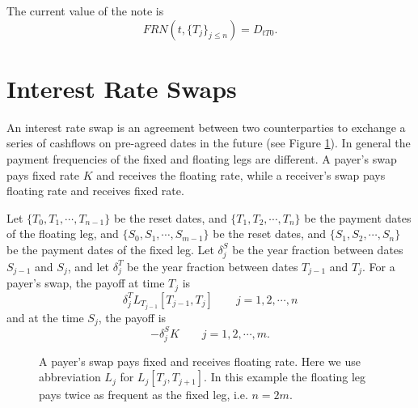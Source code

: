 The current value of the note is
\begin{equation}
  FRN(t,\{T_j\}_{j\le n}) = D_{tT0}.
\end{equation}


\section{Interest Rate Swaps}
An interest rate swap is an agreement between two counterparties
to exchange a series of cashflows on pre-agreed dates in the future (see Figure
\ref{F:swap}). In general the payment frequencies of the fixed and floating legs
are different. A payer's swap pays fixed rate $K$ and receives the floating rate, 
while a receiver's swap pays floating rate and receives fixed rate.

Let $\{T_0,T_1,\cdots,T_{n-1}\}$ be the reset dates, and
$\{T_1,T_2,\cdots,T_{n}\}$ be the payment dates of the floating leg, and
$\{S_0,S_1,\cdots,S_{m-1}\}$ be the reset dates, and
$\{S_1,S_2,\cdots,S_{n}\}$ be the payment dates of the fixed leg. 
Let $\delta^S_j$ be the year fraction between dates $S_{j-1}$ and $S_{j}$,
and let $\delta^T_{j}$ be the year fraction between dates $T_{j-1}$ and 
$T_{j}$. For a payer's swap, the payoff at time $T_j$ is
\[
  \delta^T_j L_{T_{j-1}}[T_{j-1},T_j]  \qquad j=1,2,\cdots,n
\]
and at the time $S_j$, the payoff is
\[
  - \delta^S_j K  \qquad j=1,2,\cdots,m.
\]

\begin{figure}
  \caption{A payer's swap pays fixed and receives floating rate. Here we use
           abbreviation $L_j$ for $L_j[T_j,T_{j+1}]$. In this example the
           floating leg pays twice as frequent as the fixed leg, i.e. $n=2m$.}
  \label{F:swap}
\end{figure}

